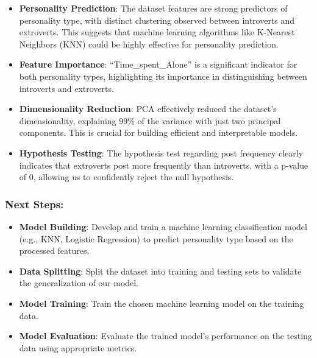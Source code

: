 \documentclass[
]{article}
\providecommand{\tightlist}{%
  \setlength{\itemsep}{0pt}\setlength{\parskip}{0pt}}
\begin{document}
\begin{itemize}
\tightlist
\item
  \textbf{Personality Prediction}: The dataset features are strong
  predictors of personality type, with distinct clustering observed
  between introverts and extroverts. This suggests that machine learning
  algorithms like K-Nearest Neighbors (KNN) could be highly effective
  for personality prediction.
\item
  \textbf{Feature Importance}: ``Time\_spent\_Alone'' is a significant
  indicator for both personality types, highlighting its importance in
  distinguishing between introverts and extroverts.
\item
  \textbf{Dimensionality Reduction}: PCA effectively reduced the
  dataset's dimensionality, explaining 99\% of the variance with just
  two principal components. This is crucial for building efficient and
  interpretable models.
\item
  \textbf{Hypothesis Testing}: The hypothesis test regarding post
  frequency clearly indicates that extroverts post more frequently than
  introverts, with a p-value of 0, allowing us to confidently reject the
  null hypothesis.
\end{itemize}

\hypertarget{next-steps}{%
\subsubsection{Next Steps:}\label{next-steps}}

\begin{itemize}
\tightlist
\item
  \textbf{Model Building}: Develop and train a machine learning
  classification model (e.g., KNN, Logistic Regression) to predict
  personality type based on the processed features.
\item
  \textbf{Data Splitting}: Split the dataset into training and testing
  sets to validate the generalization of our model.
\item
  \textbf{Model Training}: Train the chosen machine learning model on
  the training data.
\item
  \textbf{Model Evaluation}: Evaluate the trained model's performance on
  the testing data using appropriate metrics.
\end{itemize}
\end{document}
